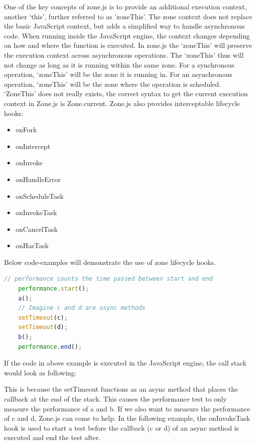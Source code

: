 One of the key concepts of zone.js is to provide an additional execution context, another ‘this’, further referred to as 'zoneThis'. The zone context does not replace the basic JavaScript context, but adds a simplified way to handle asynchronous code. When running inside the JavaScript engine, the context changes depending on how and where the function is executed. In zone.js the ‘zoneThis’ will preserve the execution context across asynchronous operations. The ‘zoneThis’ thus will not change as long as it is running within the same zone. For a synchronous operation, ‘zoneThis’ will be the zone it is running in. For an asynchronous operation, ‘zoneThis’ will be the zone where the operation is scheduled. ‘ZoneThis’ does not really exists, the correct syntax to get the current execution context in Zone.js is Zone.current.
Zone.js also provides interceptable lifecycle hooks:
\begin{itemize}
	\item onFork
	\item onIntercept
	\item onInvoke
	\item onHandleError
	\item onScheduleTask
	\item onInvokeTask
	\item onCancelTask
	\item onHasTask
\end{itemize}

Below code-examples will demonstrate the use of zone lifecycle hooks.

\begin{lstlisting}[language=Javascript]
	// performance counts the time passed between start and end
	performance.start();
	a();
	// Imagine c and d are async methods
	setTimeout(c);
	setTimeout(d);
	b();
	performance.end();
\end{lstlisting}


If the code in above example is executed in the JavaScript engine, the call stack would look as following: 


This is because the setTimeout functions as an async method that places the callback at the end of the stack. This causes the performance test to only measure the performance of a and b. If we also want to measure the performance of c and d, Zone.js can come to help. In the following example, the onInvokeTask hook is used to start a test before the callback (c or d) of an async method is executed and end the test after.

